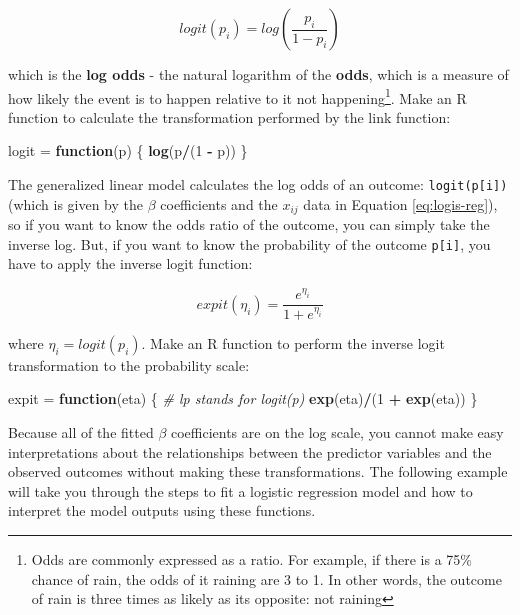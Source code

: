 \documentclass[]{book}
\newenvironment{Shaded}{\begin{snugshade}}{\end{snugshade}}
\newcommand{\CommentTok}[1]{\textcolor[rgb]{0.56,0.35,0.01}{\textit{#1}}}
\newcommand{\ControlFlowTok}[1]{\textcolor[rgb]{0.13,0.29,0.53}{\textbf{#1}}}
\newcommand{\DecValTok}[1]{\textcolor[rgb]{0.00,0.00,0.81}{#1}}
\newcommand{\KeywordTok}[1]{\textcolor[rgb]{0.13,0.29,0.53}{\textbf{#1}}}
\newcommand{\NormalTok}[1]{#1}
\newcommand{\OperatorTok}[1]{\textcolor[rgb]{0.81,0.36,0.00}{\textbf{#1}}}
\newcommand{\StringTok}[1]{\textcolor[rgb]{0.31,0.60,0.02}{#1}}
\let\rmarkdownfootnote\footnote%
\def\footnote{\protect\rmarkdownfootnote}
\begin{document}
\begin{equation}
  logit(p_i) = log\left(\frac{p_i}{1-p_i}\right)
\label{eq:logit}
\end{equation}

which is the \textbf{log odds} - the natural logarithm of the \textbf{odds}, which is a measure of how likely the event is to happen relative to it not happening\footnote{Odds are commonly expressed as a ratio. For example, if there is a 75\% chance of rain, the odds of it raining are 3 to 1. In other words, the outcome of rain is three times as likely as its opposite: not raining}. Make an R function to calculate the transformation performed by the link function:

\begin{Shaded}
\begin{Highlighting}[]
\NormalTok{logit =}\StringTok{ }\ControlFlowTok{function}\NormalTok{(p) \{}
  \KeywordTok{log}\NormalTok{(p}\OperatorTok{/}\NormalTok{(}\DecValTok{1} \OperatorTok{-}\StringTok{ }\NormalTok{p))}
\NormalTok{\}}
\end{Highlighting}
\end{Shaded}

The generalized linear model calculates the log odds of an outcome: \texttt{logit(p{[}i{]})} (which is given by the \(\beta\) coefficients and the \(x_{ij}\) data in Equation \eqref{eq:logis-reg}), so if you want to know the odds ratio of the outcome, you can simply take the inverse log. But, if you want to know the probability of the outcome \texttt{p{[}i{]}}, you have to apply the inverse logit function:

\begin{equation}
  expit(\eta_i)=\frac{e^{\eta_i}}{1 + e^{\eta_i}}
\label{eq:expit}
\end{equation}

where \(\eta_i = logit(p_i)\). Make an R function to perform the inverse logit transformation to the probability scale:

\begin{Shaded}
\begin{Highlighting}[]
\NormalTok{expit =}\StringTok{ }\ControlFlowTok{function}\NormalTok{(eta) \{  }\CommentTok{# lp stands for logit(p)}
  \KeywordTok{exp}\NormalTok{(eta)}\OperatorTok{/}\NormalTok{(}\DecValTok{1} \OperatorTok{+}\StringTok{ }\KeywordTok{exp}\NormalTok{(eta))}
\NormalTok{\}}
\end{Highlighting}
\end{Shaded}

Because all of the fitted \(\beta\) coefficients are on the log scale, you cannot make easy interpretations about the relationships between the predictor variables and the observed outcomes without making these transformations. The following example will take you through the steps to fit a logistic regression model and how to interpret the model outputs using these functions.
\end{document}
